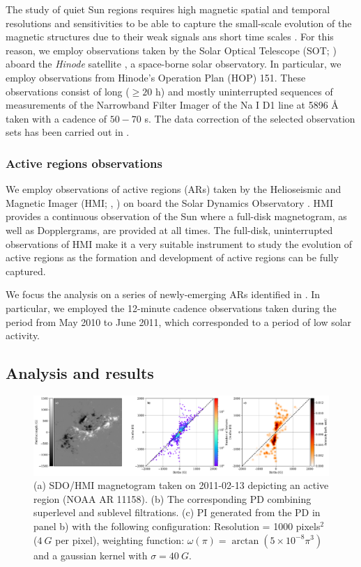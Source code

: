 The study of quiet Sun regions requires high magnetic spatial and temporal resolutions and sensitivities to be able to capture the small-scale evolution of the magnetic structures due to their weak signals ans short time scales \citep{quiet_sun_living_review}. For this reason, we employ observations taken by the Solar Optical Telescope (SOT; \citealt{sot}) aboard the \textit{Hinode} satellite \citep{Hinode}, a space-borne solar observatory. In particular, we employ observations from Hinode's Operation Plan (HOP) 151. These observations consist of long ($\ge 20$ h) and mostly uninterrupted sequences of measurements of the Narrowband Filter Imager of the Na I D1 line at 5896 \r{A} taken with a cadence of $50-70$ s. The data correction of the selected observation sets has been carried out in \citep{gosic}.


\subsubsection{Active regions observations}

We employ observations of active regions (ARs) taken by the Helioseismic and Magnetic Imager (HMI; \citealt{hmi1}, \citealt{hmi2}) on board the Solar Dynamics Observatory \citep{SDO}. HMI provides a continuous observation of the Sun where a full-disk magnetogram, as well as Dopplergrams, are provided at all times. The full-disk, uninterrupted observations of HMI make it a very suitable instrument to study the evolution of active regions as the formation and development of active regions can be fully captured. 

We focus the analysis on a series of newly-emerging ARs identified in \citep{toriumi}. In particular, we employed the 12-minute cadence observations taken during the period from May 2010 to June 2011, which corresponded to a period of low solar activity.

\subsection{Analysis and results}

\begin{figure}
    \centering
     \includegraphics[width=\textwidth]{figures/PersistentHomology/PI_PD_example.pdf}
    \caption[Peristent diagram of an active region]{(a) SDO/HMI magnetogram taken on 2011-02-13 depicting an active region (NOAA AR 11158). (b) The corresponding PD combining superlevel and sublevel filtrations. (c) PI generated from the PD in panel b) with the following configuration: Resolution =  1000 pixels$^2$ ($4\ G$ per pixel), weighting function: $\omega (\pi) = \arctan (5\times 10 ^{-8} \pi ^{3})$ and a gaussian kernel with $\sigma = 40\ G$.}
   \label{fig: PD+PI_example}
\end{figure}


